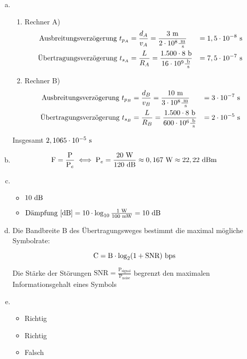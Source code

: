 
\begin{enumerate}[a)]
	\item 
		\begin{enumerate}
			\item[] Rechner A)
				\begin{align*}
	\text{Ausbreitungsverzögerung } t_{p_A} &= \frac{d_A}{v_A} = \frac{3\text{ m}}{2\cdot 10^8 \frac{\text{ m}}{\text{ s}}} &= 1,5\cdot 10^{-8}\text{ s} \\	
	\text{Übertragungsverzögerung } t_{s_A} &= \frac{L}{R_A} = \frac{1.500 \cdot 8\text{ b}}{16 \cdot 10^9 \frac{\text{ b}}{\text{ s}}} &= 7,5\cdot 10^{-7}\text{ s}
				\end{align*}
				
			\item[] Rechner B)
				\begin{align*}
	\text{Ausbreitungsverzögerung } t_{p_B} &= \frac{d_B}{v_B} = \frac{10\text{ m}}{3\cdot 10^8 \frac{\text{ m}}{\text{ s}}} &= 3\cdot 10^{-7}\text{ s} \\	
	\text{Übertragungsverzögerung } t_{s_B} &= \frac{L}{R_B} = \frac{1.500 \cdot 8\text{ b}}{600 \cdot 10^6 \frac{\text{ b}}{\text{ s}}} &= 2\cdot 10^{-5}\text{ s}
				\end{align*}
		\end{enumerate}
		
		Insgesamt $2,1065\cdot 10^{-5}\text{ s}$
		
		\item 
			
			$$ \text{F} = \frac{\text{P}}{\text{P}_e} \iff \text{P}_e = \frac{20\text{ W}}{120\text{ dB}} \approx 0,167 \text{ W} \approx 22,22\text{ dBm} $$	
		
		\item 
	
			\begin{itemize}
				\item $10 \text{ dB}$
				\item $ \text{Dämpfung [dB]} = 10 \cdot \log_{10}{\frac{1\text{ W}}{100\text{ mW}}} = 10\text{ dB} $
			\end{itemize}					
		
		\item  Die Bandbreite B des Übertragungsweges bestimmt die maximal mögliche Symbolrate:
		
			$$ \text{C} = \text{B} \cdot \log_2(1+\text{SNR}) \text{ bps} $$
			
			Die Stärke der Störungen $\text{SNR} = \frac{\text{P}_\text{signal}}{\text{P}_\text{noise}}$ begrenzt den maximalen Informationsgehalt eines Symbols
			
			
		\item 
		
			\begin{itemize}
				\item Richtig
				\item Richtig
				\item Falsch
			\end{itemize}
\end{enumerate}






